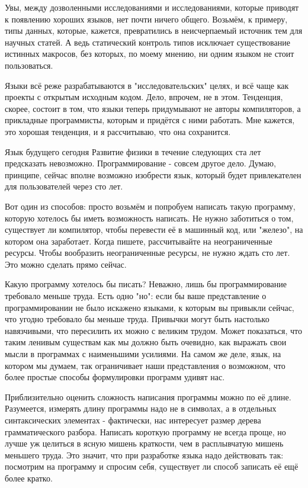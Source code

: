 \documentclass[ebook,12pt,oneside,openany]{memoir}
\begin{document}
Увы, между дозволенными исследованиями и исследованиями, которые
приводят к появлению хороших языков, нет почти ничего общего. Возьмём,
к примеру, типы данных, которые, кажется, превратились в неисчерпаемый
источник тем для научных статей. А ведь статический контроль типов
исключает существование истинных макросов, без которых, по моему
мнению, ни одним языком не стоит пользоваться.

Языки всё реже разрабатываются в "исследовательских" целях, и всё чаще
как проекты с открытым исходным кодом. Дело, впрочем, не в этом.
Тенденция, скорее, состоит в том, что языки теперь придумывают не
авторы компиляторов, а прикладные программисты, которым и придётся с
ними работать. Мне кажется, это хорошая тенденция, и я рассчитываю,
что она сохранится.

Язык будущего сегодня Развитие физики в течение следующих ста лет
предсказать невозможно. Программирование - совсем другое дело. Думаю,
принципе, сейчас вполне возможно изобрести язык, который будет
привлекателен для пользователей через сто лет.

Вот один из способов: просто возьмём и попробуем написать такую
программу, которую хотелось бы иметь возможность написать. Не нужно
заботиться о том, существует ли компилятор, чтобы перевести её в
машинный код, или "железо", на котором она заработает. Когда пишете,
рассчитывайте на неограниченные ресурсы. Чтобы вообразить
неограниченные ресурсы, не нужно ждать сто лет. Это можно сделать
прямо сейчас.

Какую программу хотелось бы писать? Неважно, лишь бы программирование
требовало меньше труда. Есть одно "но": если бы ваше представление о
программировании не было искажено языками, к которым вы привыкли
сейчас, что угодно требовало бы меньше труда. Привычки могут быть
настолько навязчивыми, что пересилить их можно с великим трудом. Может
показаться, что таким ленивым существам как мы должно быть очевидно,
как выражать свои мысли в программах с наименьшими усилиями. На самом
же деле, язык, на котором мы думаем, так ограничивает наши
представления о возможном, что более простые способы формулировки
программ удивят нас.

Приблизительно оценить сложность написания программы можно по её
длине. Разумеется, измерять длину программы надо не в символах, а в
отдельных синтаксических элементах - фактически, нас интересует размер
дерева грамматического разбора. Написать короткую программу не всегда
проще, но лучше уж целиться в ясную мишень краткости, чем в
расплывчатую мишень меньшего труда. Это значит, что при разработке
языка надо действовать так: посмотрим на программу и спросим себя,
существует ли способ записать её ещё более кратко.
\end{document}
